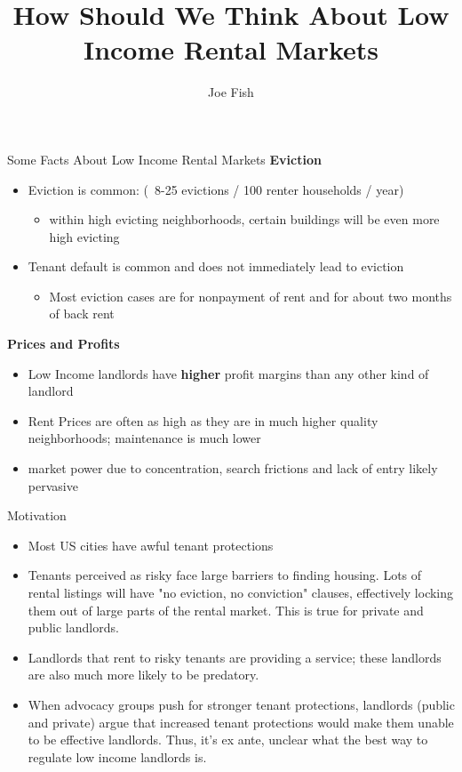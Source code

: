 \documentclass[10pt, xcolor=dvipsnames]{beamer}
\date{}
\title[How Should We Think About Low Income Rental Markets]{How Should We Think About Low Income Rental Markets} %
\author[Joe Fish]{Joe Fish}
\begin{document}
\begin{frame}
\titlepage %
\end{frame}

\begin{frame}{Some Facts About Low Income Rental Markets}
\textbf{Eviction}
    \begin{itemize}
        \item Eviction is common: (~8-25 evictions / 100 renter households / year)
        \begin{itemize}
            \item within high evicting neighborhoods, certain buildings will be even more high evicting
        \end{itemize}
        \item Tenant default is common and does not immediately lead to eviction
        \begin{itemize}
            \item Most eviction cases are for nonpayment of rent and for about two months of back rent
        \end{itemize}
    \end{itemize}
    \pause
\textbf{Prices and Profits}
\begin{itemize}
        \item Low Income landlords have \textbf{higher} profit margins than any other kind of landlord
        \item Rent Prices are often as high as they are in much higher quality neighborhoods; maintenance is much lower 
        \item market power due to concentration, search frictions and lack of entry likely pervasive
\end{itemize}
    
\end{frame}

\begin{frame}{Motivation}

\begin{itemize}
    \item Most US cities have awful tenant protections
    \item Tenants perceived as risky face large barriers to finding housing. Lots of rental listings will have "no eviction, no conviction" clauses, effectively locking them out of large parts of the rental market. This is true for private and public landlords.
    \item Landlords that rent to risky tenants are providing a service; these landlords are also much more likely to be predatory.
    \item When advocacy groups push for stronger tenant protections, landlords (public and private) argue that increased tenant protections would make them unable to be effective landlords. Thus, it's ex ante, unclear what the best way to regulate low income landlords is.
\end{itemize}
\end{frame}
\end{document}
